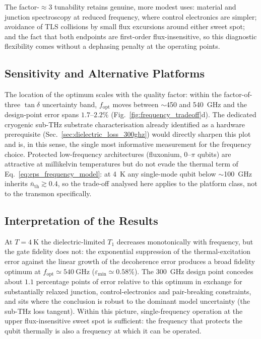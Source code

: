 The factor-$\approx 3$ tunability retains genuine, more modest uses: material
and junction spectroscopy at reduced frequency, where control electronics are
simpler; avoidance of TLS collisions by small flux excursions around either
sweet spot; and the fact that both endpoints are first-order flux-insensitive,
so this diagnostic flexibility comes without a dephasing penalty at the
operating points.

\subsection{Sensitivity and Alternative Platforms}

The location of the optimum scales with the quality factor: within the
factor-of-three $\tan\delta$ uncertainty band, $f_{\text{opt}}$ moves between
$\sim$\SI{450}{} and \SI{540}{\giga\hertz} and the design-point error spans
$1.7$--$2.2\%$ (Fig.~\ref{fig:frequency_tradeoff}d). The dedicated cryogenic
sub-THz substrate characterisation already identified as a hardware
prerequisite (Sec.~\ref{sec:dielectric_loss_300ghz}) would directly sharpen
this plot and is, in this sense, the single most informative measurement for
the frequency choice. Protected low-frequency architectures (fluxonium,
$0$--$\pi$ qubits) are attractive at millikelvin temperatures but do not evade
the thermal term of Eq.~\eqref{eq:eps_frequency_model}: at \SI{4}{\kelvin} any
single-mode qubit below $\sim$\SI{100}{\giga\hertz} inherits
$\bar{n}_{\text{th}} \gtrsim 0.4$, so the trade-off analysed here applies to
the platform class, not to the transmon specifically.

\subsection{Interpretation of the Results}

At $T = \SI{4}{\kelvin}$ the dielectric-limited $T_1$ decreases monotonically
with frequency, but the gate fidelity does not: the exponential suppression of
the thermal-excitation error against the linear growth of the decoherence
error produces a broad fidelity optimum at
$f_{\text{opt}} \simeq \SI{540}{\giga\hertz}$
($\varepsilon_{\min} \simeq 0.58\%$). The \SI{300}{\giga\hertz} design point
concedes about $1.1$ percentage points of error relative to this optimum in
exchange for substantially relaxed junction, control-electronics and
pair-breaking constraints, and sits where the conclusion is robust to the
dominant model uncertainty (the sub-THz loss tangent). Within this picture,
single-frequency operation at the upper flux-insensitive sweet spot is
sufficient: the frequency that protects the qubit thermally is also a
frequency at which it can be operated.

